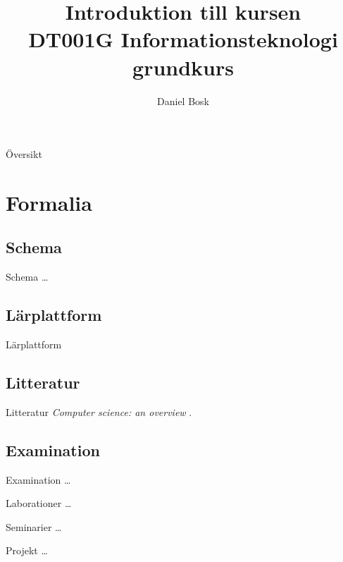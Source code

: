 \documentclass{beamer}
\title[Introduktion]{%
	Introduktion till kursen\\
	DT001G Informationsteknologi grundkurs
}
\author{Daniel Bosk}
\institute[MIUN ITM]{%
	Institutionen för informationsteknologi och medier (ITM),\\
	Mittuniversitetet, Sundsvall.
}
\date{\svnId}
\begin{document}
\begin{frame}
  \titlepage
\end{frame}

\begin{frame}{Översikt}
	\tableofcontents
\end{frame}





\section{Formalia}

\subsection{Schema}
\begin{frame}{Schema}
	\dots
\end{frame}

\subsection{Lärplattform}
\begin{frame}{Lärplattform}
\end{frame}

\subsection{Litteratur}
\begin{frame}{Litteratur}
	\emph{Computer science: an overview} \cite{Brookshear2012csa}.
\end{frame}

\subsection{Examination}
\begin{frame}{Examination}
	\dots
\end{frame}
\begin{frame}{Laborationer}
	\dots
\end{frame}
\begin{frame}{Seminarier}
	\dots
\end{frame}
\begin{frame}{Projekt}
	\dots
\end{frame}
\end{document}
